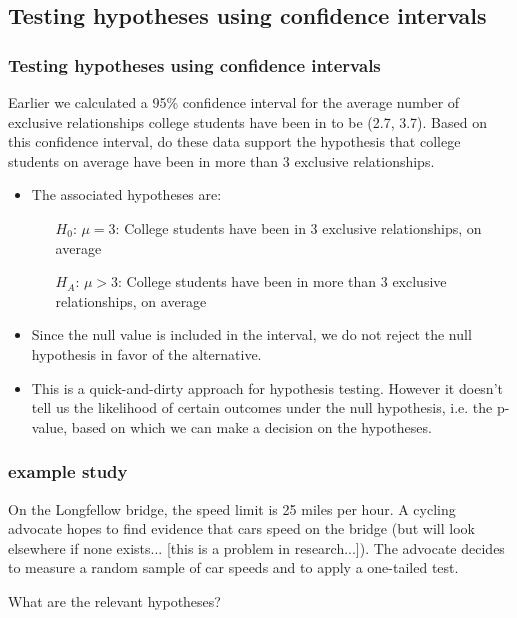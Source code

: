 
\subsection{Testing hypotheses using confidence intervals} 


\begin{frame}
\frametitle{Testing hypotheses using confidence intervals}
\vspace{-10pt}
{\small Earlier we calculated a 95\% confidence interval for the average number of exclusive relationships college students have been in to be (2.7, 3.7). Based on this confidence interval, do these data support the hypothesis that college students on average have been in more than 3 exclusive relationships.}

\pause

\begin{itemize}

\item The associated hypotheses are:
\begin{itemize}
\item[$H_0$:] $\mu = 3$: College students have been in 3 exclusive relationships, on average
\item[$H_A$:] $\mu > 3$: College students have been in more than 3 exclusive relationships, on average
\end{itemize}

\pause

\item Since the null value is included in the interval, we do not reject the null hypothesis in favor of the alternative.

\pause

\item This is a quick-and-dirty approach for hypothesis testing. However it doesn't tell us the likelihood of certain outcomes under the null hypothesis, i.e. the p-value, based on which we can make a decision on the hypotheses.

\end{itemize}

\end{frame}



\begin{frame}
\frametitle{example study}
On the Longfellow bridge, the speed limit is 25 miles per hour. A cycling advocate hopes to find evidence that cars speed on the bridge (but will look elsewhere if none exists... [this is a problem in research...]). The advocate decides to measure a random sample of car speeds and to apply a one-tailed test.\pause

What are the relevant hypotheses? \pause

 \pause 

\end{frame}

